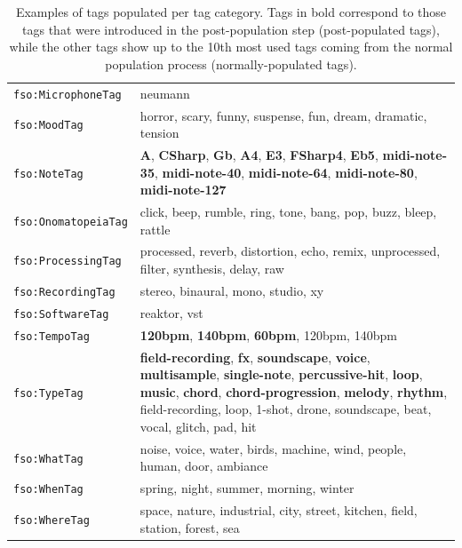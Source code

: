 \begin{table}
\begin{center}
\begin{tabular}{@{}lp{10cm}@{}}
\texttt{fso:MicrophoneTag} & neumann \\ %
\texttt{fso:MoodTag} & horror, scary, funny, suspense, fun, dream, dramatic, tension \\
\texttt{fso:NoteTag} & \textbf{A}, \textbf{CSharp}, \textbf{Gb}, \textbf{A4}, \textbf{E3}, \textbf{FSharp4}, \textbf{Eb5}, \textbf{midi-note-35}, \textbf{midi-note-40}, \textbf{midi-note-64}, \textbf{midi-note-80}, \textbf{midi-note-127} \\
\texttt{fso:OnomatopeiaTag} & click, beep, rumble, ring, tone, bang, pop, buzz, bleep, rattle \\
\texttt{fso:ProcessingTag} & processed, reverb, distortion, echo, remix, unprocessed, filter, synthesis, delay, raw \\
\texttt{fso:RecordingTag} & stereo, binaural, mono, studio, xy \\
\texttt{fso:SoftwareTag} & reaktor, vst \\
\texttt{fso:TempoTag} & \textbf{120bpm}, \textbf{140bpm}, \textbf{60bpm}, 120bpm, 140bpm \\
\texttt{fso:TypeTag} & \textbf{field-recording}, \textbf{fx}, \textbf{soundscape}, \textbf{voice}, \textbf{multisample}, \textbf{single-note}, \textbf{percussive-hit}, \textbf{loop}, \textbf{music}, \textbf{chord}, \textbf{chord-progression}, \textbf{melody}, \textbf{rhythm}, field-recording, loop, 1-shot, drone, soundscape, beat, vocal, glitch, pad, hit \\
\texttt{fso:WhatTag} & noise, voice, water, birds, machine, wind, people, human, door, ambiance \\
\texttt{fso:WhenTag} & spring, night, summer, morning, winter \\
\texttt{fso:WhereTag} & space, nature, industrial, city, street, kitchen, field, station, forest, sea \\
\bottomrule
\end{tabular}
\caption[Examples of tags populated per tag category]{Examples of tags populated per tag category. Tags in bold correspond to those tags that were introduced in the post-population step (post-populated tags), while the other tags show up to the 10th most used tags coming from the normal population process (normally-populated tags).}
\label{tab:ontology_tag_categories_most_popular_tags}
\end{center}
\end{table}

